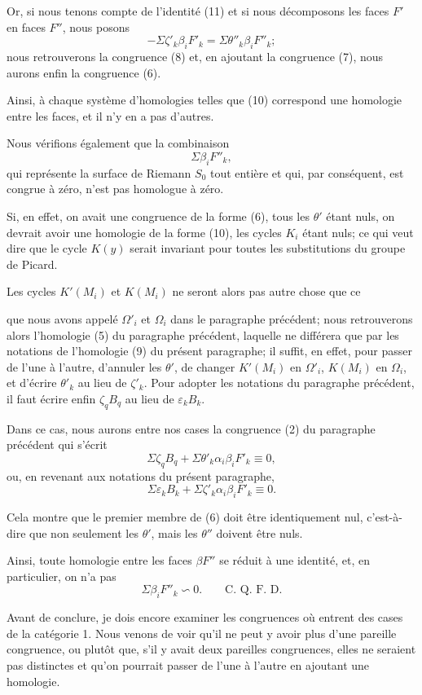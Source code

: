 \documentclass{article}
\begin{document}
Or, si nous tenons compte de l'identité (11) et si nous décomposons les faces $F'$ en faces $F''$, nous posons
\[ -\Sigma \zeta'_{k} \beta_{i}F'_{k} = \Sigma \theta''_{k} \beta_{i}F''_{k}; \]
nous retrouverons la congruence (8) et, en ajoutant la congruence (7), nous aurons enfin la congruence (6).

Ainsi, à chaque système d'homologies telles que (10) correspond une homologie entre les faces, et il n'y en a pas d'autres.

Nous vérifions également que la combinaison
\[ \Sigma \beta_{i}F''_{k}, \]
qui représente la surface de Riemann $S_{0}$ tout entière et qui, par conséquent, est congrue à zéro, n'est pas homologue à zéro.

Si, en effet, on avait une congruence de la forme (6), tous les $\theta'$ étant nuls, on devrait avoir une homologie de la forme (10), les cycles $K_{i}$ étant nuls; ce qui veut dire que le cycle $K(y)$ serait invariant pour toutes les substitutions du groupe de Picard.

Les cycles $K'(M_{i})$ et $K(M_{i})$ ne seront alors pas autre chose que ce

que nous avons appelé $\Omega'_{i}$ et $\Omega_{i}$ dans le paragraphe précédent; nous retrouverons alors l'homologie (5) du paragraphe précédent, laquelle ne différera que par les notations de l'homologie (9) du présent paragraphe; il suffit, en effet, pour passer de l'une à l'autre, d'annuler les $\theta'$, de changer $K'(M_{i})$ en $\Omega'_{i}$, $K(M_{i})$ en $\Omega_{i}$, et d'écrire $\theta'_{k}$ au lieu de $\zeta'_{k}$. Pour adopter les notations du paragraphe précédent, il faut écrire enfin $\zeta_{q}B_{q}$ au lieu de $\varepsilon_{k}B_{k}$.

Dans ce cas, nous aurons entre nos cases la congruence (2) du paragraphe précédent qui s'écrit
\[ \Sigma \zeta_{q} B_{q} + \Sigma \theta'_{k} \alpha_{i}\beta_{i}F'_{k} \equiv 0, \]
ou, en revenant aux notations du présent paragraphe,
\[ \Sigma \varepsilon_{k} B_{k} + \Sigma \zeta'_{k} \alpha_{i}\beta_{i}F'_{k} \equiv 0. \]

Cela montre que le premier membre de (6) doit être identiquement nul, c'est-à-dire que non seulement les $\theta'$, mais les $\theta''$ doivent être nuls.

Ainsi, toute homologie entre les faces $\beta F''$ se réduit à une identité, et, en particulier, on n'a pas
\[ \Sigma \beta_{i}F''_{k} \backsim 0. \qquad \text{C.~Q.~F.~D.} \]

Avant de conclure, je dois encore examiner les congruences où entrent des cases de la catégorie 1. Nous venons de voir qu'il ne peut y avoir plus d'une pareille congruence, ou plutôt que, s'il y avait deux pareilles congruences, elles ne seraient pas distinctes et qu'on pourrait passer de l'une à l'autre en ajoutant une homologie.
\end{document}
